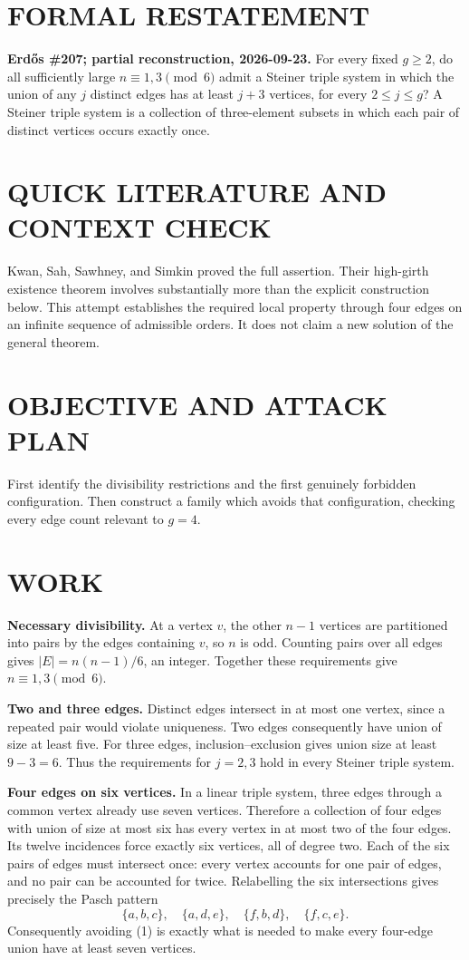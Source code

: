 \section{FORMAL RESTATEMENT}
\textbf{Erd\H{o}s \#207; partial reconstruction, 2026-09-23.}
For every fixed $g\geq2$, do all sufficiently large $n\equiv1,3\pmod6$ admit a Steiner triple system in which the union of any $j$ distinct edges has at least $j+3$ vertices, for every $2\leq j\leq g$? A Steiner triple system is a collection of three-element subsets in which each pair of distinct vertices occurs exactly once.

\section{QUICK LITERATURE AND CONTEXT CHECK}
Kwan, Sah, Sawhney, and Simkin proved the full assertion. Their high-girth existence theorem involves substantially more than the explicit construction below. This attempt establishes the required local property through four edges on an infinite sequence of admissible orders. It does not claim a new solution of the general theorem.

\section{OBJECTIVE AND ATTACK PLAN}
First identify the divisibility restrictions and the first genuinely forbidden configuration. Then construct a family which avoids that configuration, checking every edge count relevant to $g=4$.

\section{WORK}
\textbf{Necessary divisibility.} At a vertex $v$, the other $n-1$ vertices are partitioned into pairs by the edges containing $v$, so $n$ is odd. Counting pairs over all edges gives $|E|=n(n-1)/6$, an integer. Together these requirements give $n\equiv1,3\pmod6$.

\textbf{Two and three edges.} Distinct edges intersect in at most one vertex, since a repeated pair would violate uniqueness. Two edges consequently have union of size at least five. For three edges, inclusion--exclusion gives union size at least $9-3=6$. Thus the requirements for $j=2,3$ hold in every Steiner triple system.

\textbf{Four edges on six vertices.} In a linear triple system, three edges through a common vertex already use seven vertices. Therefore a collection of four edges with union of size at most six has every vertex in at most two of the four edges. Its twelve incidences force exactly six vertices, all of degree two. Each of the six pairs of edges must intersect once: every vertex accounts for one pair of edges, and no pair can be accounted for twice. Relabelling the six intersections gives precisely the Pasch pattern
\[
\{a,b,c\},\quad\{a,d,e\},\quad\{f,b,d\},\quad\{f,c,e\}.
\tag{1}
\]
Consequently avoiding (1) is exactly what is needed to make every four-edge union have at least seven vertices.

